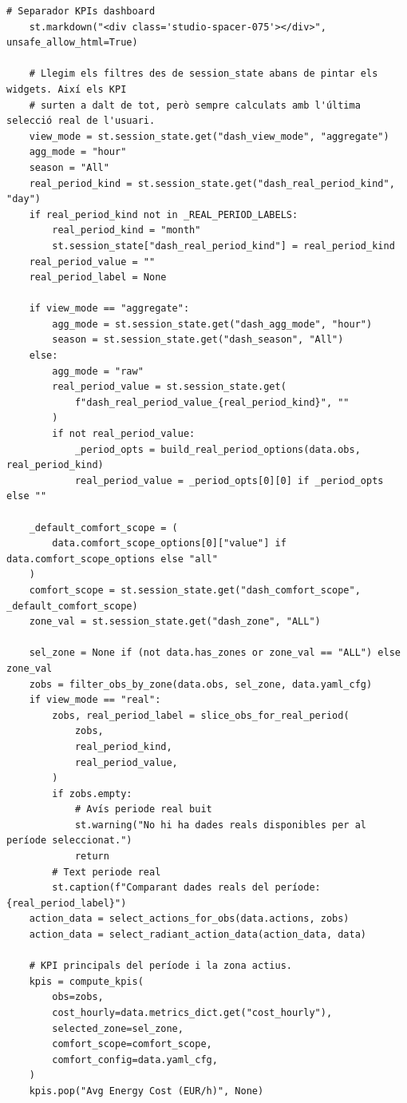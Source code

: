 \documentclass[10pt,a4paper]{article}
\begin{document}
\begin{lstlisting}[style=studioPython,caption={page\_components/resultats\_dashboard.py},label={lst:page-components-resultats-dashboard-py}]
    # Separador KPIs dashboard
    st.markdown("<div class='studio-spacer-075'></div>", unsafe_allow_html=True)

    # Llegim els filtres des de session_state abans de pintar els widgets. Així els KPI
    # surten a dalt de tot, però sempre calculats amb l'última selecció real de l'usuari.
    view_mode = st.session_state.get("dash_view_mode", "aggregate")
    agg_mode = "hour"
    season = "All"
    real_period_kind = st.session_state.get("dash_real_period_kind", "day")
    if real_period_kind not in _REAL_PERIOD_LABELS:
        real_period_kind = "month"
        st.session_state["dash_real_period_kind"] = real_period_kind
    real_period_value = ""
    real_period_label = None

    if view_mode == "aggregate":
        agg_mode = st.session_state.get("dash_agg_mode", "hour")
        season = st.session_state.get("dash_season", "All")
    else:
        agg_mode = "raw"
        real_period_value = st.session_state.get(
            f"dash_real_period_value_{real_period_kind}", ""
        )
        if not real_period_value:
            _period_opts = build_real_period_options(data.obs, real_period_kind)
            real_period_value = _period_opts[0][0] if _period_opts else ""

    _default_comfort_scope = (
        data.comfort_scope_options[0]["value"] if data.comfort_scope_options else "all"
    )
    comfort_scope = st.session_state.get("dash_comfort_scope", _default_comfort_scope)
    zone_val = st.session_state.get("dash_zone", "ALL")

    sel_zone = None if (not data.has_zones or zone_val == "ALL") else zone_val
    zobs = filter_obs_by_zone(data.obs, sel_zone, data.yaml_cfg)
    if view_mode == "real":
        zobs, real_period_label = slice_obs_for_real_period(
            zobs,
            real_period_kind,
            real_period_value,
        )
        if zobs.empty:
            # Avís periode real buit
            st.warning("No hi ha dades reals disponibles per al període seleccionat.")
            return
        # Text periode real
        st.caption(f"Comparant dades reals del període: {real_period_label}")
    action_data = select_actions_for_obs(data.actions, zobs)
    action_data = select_radiant_action_data(action_data, data)

    # KPI principals del període i la zona actius.
    kpis = compute_kpis(
        obs=zobs,
        cost_hourly=data.metrics_dict.get("cost_hourly"),
        selected_zone=sel_zone,
        comfort_scope=comfort_scope,
        comfort_config=data.yaml_cfg,
    )
    kpis.pop("Avg Energy Cost (EUR/h)", None)


\end{lstlisting}
\end{document}
